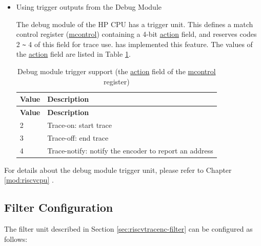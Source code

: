\documentclass[main\_\_EN.tex]{subfiles}
\begin{document}
\begin{itemize}
        \item Using trigger outputs from the Debug Module

            The debug module of the HP CPU has a trigger unit. This defines a match control register (\hyperref[regdesc:MCONTROL]{mcontrol}) containing a 4-bit \hyperref[fielddesc:MCONTROLACTION]{action} field, and reserves codes 2 \verb+~+ 4 of this field for trace use. \chipname{} has implemented this feature. The values of the \hyperref[fielddesc:MCONTROLACTION]{action} field are listed in Table \ref{tab:debug_mcontrol}.

            \begin{longtable}[c]{ |l|l| }
    \caption{Debug module trigger support (the \hyperref[fielddesc:MCONTROLACTION]{action} field of the \hyperref[regdesc:MCONTROL]{mcontrol} register)}
    \label{tab:debug_mcontrol}
    \\\hline\rowcolor{lightgray}
    \textbf{Value} & \textbf{Description} \\\hline
    \endfirsthead
    \textbf{Value} & \textbf{Description} \\\hline
    \endhead
    \endfoot
    \endlastfoot

    2 & Trace-on: start trace \\\hline
    3 & Trace-off: end trace \\\hline
    4 & Trace-notify: notify the encoder to report an address \\\hline

    \end{longtable}
\end{itemize}

For details about the debug module trigger unit, please refer to Chapter \ref{mod:riscvcpu} \textit{}.


\subsection{Filter Configuration}


The filter unit described in Section \ref{sec:riscvtracenc-filter} can be configured as follows:
\end{document}
